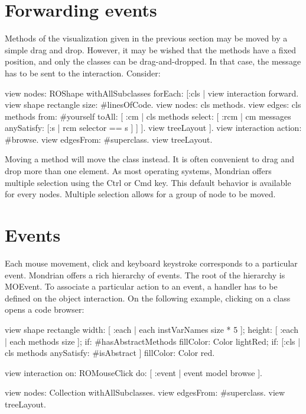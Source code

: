 \documentclass[a4paper,10pt,twoside]{book}
\begin{document}
\section{Forwarding events}

Methods of the visualization given in the previous section may be moved by a simple drag and drop. However, it may be wished that the methods have a fixed position, and only the classes can be drag-and-dropped. In that case, the message  has to be sent to the interaction. Consider:

\newpage
\begin{code}{}
view nodes: ROShape withAllSubclasses forEach: [:cls |
	view interaction forward.
	view shape rectangle 
					size: #linesOfCode.
	view nodes: cls methods.
	view edges: cls methods from: #yourself toAll: [ :cm | cls methods select: [ :rcm |  cm messages anySatisfy: [:s | rcm selector == s ] ] ].
	view treeLayout
].
view interaction action: #browse.
view edgesFrom: #superclass.
view treeLayout.
\end{code}

Moving a method will move the class instead. It is often convenient to drag and drop more than one element. As most operating systems, Mondrian offers multiple selection using the Ctrl or Cmd key. This default behavior is available for every nodes. Multiple selection allows for a group of node to be moved.


\section{Events}

Each mouse movement, click and keyboard keystroke corresponds to a particular event. Mondrian offers a rich hierarchy of events. The root of the hierarchy is MOEvent. To associate a particular action to an event, a handler has to be defined on the object interaction. On the following example, clicking on a class opens a code browser:

\begin{code}{}
view shape rectangle
  width: [ :each | each instVarNames size * 5 ];
  height: [ :each | each methods size ];
  if: #hasAbstractMethods fillColor: Color lightRed;
  if: [:cls | cls methods anySatisfy: #isAbstract ] fillColor: Color red.
  
view interaction on: ROMouseClick do: [ :event | event model browse ].

view nodes: Collection withAllSubclasses.
view edgesFrom: #superclass.
view treeLayout.
\end{code}
\end{document}
